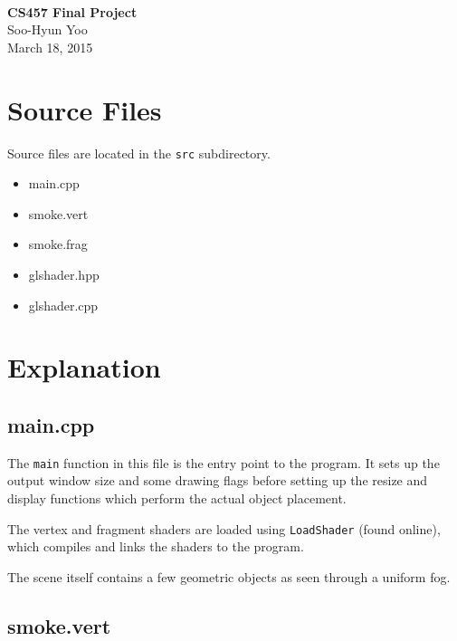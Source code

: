 \documentclass[12pt,letterpaper]{article}
\begin{document}
\fancyfoot{}
\begin{center}
    \hfill \\
    \vspace{4in}
    {\bf\Huge CS457 Final Project \\}
    \vspace{2in}
    {\Large Soo-Hyun Yoo \\ March 18, 2015}
\end{center}

\newpage
{}

\section*{Source Files}

Source files are located in the {\tt src} subdirectory.

\begin{itemize}
    \item main.cpp
    \item smoke.vert
    \item smoke.frag
    \item glshader.hpp
    \item glshader.cpp
\end{itemize}


\section*{Explanation}

\subsection*{main.cpp}

The {\tt main} function in this file is the entry point to the program. It sets
up the output window size and some drawing flags before setting up the resize
and display functions which perform the actual object placement.

The vertex and fragment shaders are loaded using {\tt LoadShader} (found
online), which compiles and links the shaders to the program.

The scene itself contains a few geometric objects as seen through a uniform
fog.

\subsection*{smoke.vert}
\end{document}
